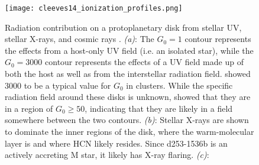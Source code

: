 \begin{figure}[t]
  \texttt{[image: cleeves14\_ionization\_profiles.png]}%
  \caption{Radiation contribution on a protoplanetary disk from stellar UV, stellar X-rays, and cosmic rays \citep{Cleeves2013}. \textit{(a)}: The $G_0 = 1$ contour represents the effects from a host-only UV field (i.e. an isolated star), while the $G_0 = 3000$ contour represents the effects of a UV field made up of both the host as well as from the interstellar radiation field. \cite{Fatuzzo2008} showed 3000 to be a typical value for $G_0$ in clusters. While the specific radiation field around these disks is unknown, \citet{Pabst2019} showed that they are in a region of $G_0 \geq 50$, indicating that they are likely in a field somewhere between the two contours. \textit{(b)}: Stellar X-rays are shown to dominate the inner regions of the disk, where the warm-molecular layer is and where HCN likely resides. Since d253-1536b is an actively accreting M star, it likely has X-ray flaring. \textit{(c)}:}
  \label{fig:disk_ionization}
\end{figure}








